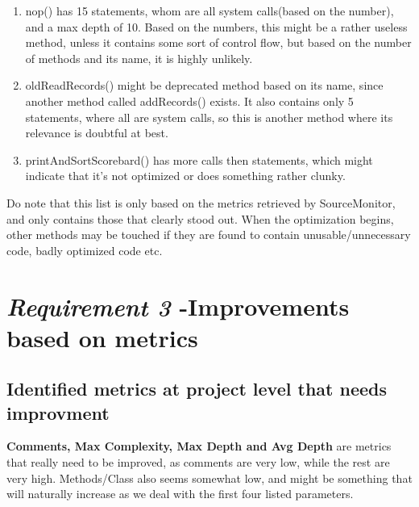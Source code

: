 \documentclass{article}
\begin{document}
\begin{enumerate}
\begin{enumerate}
\item
nop() has 15 statements, whom are all system calls(based on the number), and a max depth
of 10. Based on the numbers, this might be a rather useless method, unless it contains
some sort of control flow, but based on the number of methods and its name, it is highly unlikely.

\item
oldReadRecords() might be deprecated method based on its name, since another method called addRecords() exists. It also contains only 5 statements, where all are system calls, so this is another method where its relevance is doubtful at best.

\item
printAndSortScorebard() has more calls then statements, which might indicate that it's not optimized or does something rather clunky.

\end{enumerate}

Do note that this list is only based on the metrics retrieved by SourceMonitor, and only contains those that clearly stood out. When the optimization begins, other methods may be touched if they are found to contain unusable/unnecessary code, badly optimized code etc.

\end{enumerate}
\section{\textit{Requirement 3} -Improvements based on metrics}

\subsection{Identified metrics at project level that needs improvment}
\textbf{Comments, Max Complexity, Max Depth and Avg Depth} are metrics that really need to be improved, as comments are very low, while the rest are very high. Methods/Class also seems somewhat low, and might be something that will naturally increase as we deal with the first four listed parameters.
\end{document}
